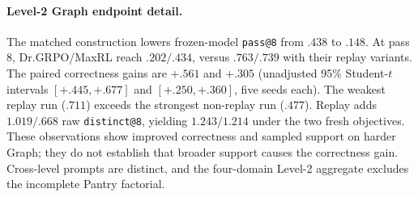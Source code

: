 \paragraph{Level-2 Graph endpoint detail.}
\label{app:levels-numerical-detail}
The matched construction lowers frozen-model \texttt{pass@8} from $.438$
to $.148$. At pass 8, Dr.GRPO/MaxRL reach $.202/.434$, versus $.763/.739$
with their replay variants. The paired correctness gains are $+.561$ and
$+.305$ (unadjusted 95\% Student-$t$ intervals $[+.445,+.677]$ and
$[+.250,+.360]$, five seeds each). The weakest replay run ($.711$) exceeds
the strongest non-replay run ($.477$). Replay adds $1.019/.668$ raw
\texttt{distinct@8}, yielding $1.243/1.214$ under the two fresh objectives.
These observations show improved correctness and sampled support on harder
Graph; they do not establish that broader support causes the correctness
gain. Cross-level prompts are distinct, and the four-domain Level-2
aggregate excludes the incomplete Pantry factorial.
